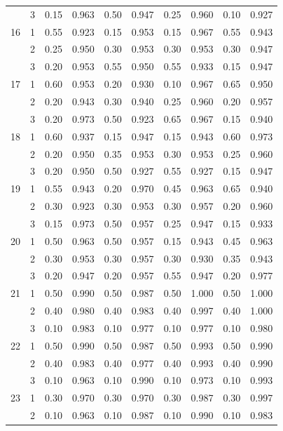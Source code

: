 \begin{longtable}{llcccccccc}
   & 3 & 0.15 & 0.963 & 0.50 & 0.947 & 0.25 & 0.960 & 0.10 & 0.927 \\ 
  16 & 1 & 0.55 & 0.923 & 0.15 & 0.953 & 0.15 & 0.967 & 0.55 & 0.943 \\ 
   & 2 & 0.25 & 0.950 & 0.30 & 0.953 & 0.30 & 0.953 & 0.30 & 0.947 \\ 
   & 3 & 0.20 & 0.953 & 0.55 & 0.950 & 0.55 & 0.933 & 0.15 & 0.947 \\ 
  17 & 1 & 0.60 & 0.953 & 0.20 & 0.930 & 0.10 & 0.967 & 0.65 & 0.950 \\ 
   & 2 & 0.20 & 0.943 & 0.30 & 0.940 & 0.25 & 0.960 & 0.20 & 0.957 \\ 
   & 3 & 0.20 & 0.973 & 0.50 & 0.923 & 0.65 & 0.967 & 0.15 & 0.940 \\ 
  18 & 1 & 0.60 & 0.937 & 0.15 & 0.947 & 0.15 & 0.943 & 0.60 & 0.973 \\ 
   & 2 & 0.20 & 0.950 & 0.35 & 0.953 & 0.30 & 0.953 & 0.25 & 0.960 \\ 
   & 3 & 0.20 & 0.950 & 0.50 & 0.927 & 0.55 & 0.927 & 0.15 & 0.947 \\ 
  19 & 1 & 0.55 & 0.943 & 0.20 & 0.970 & 0.45 & 0.963 & 0.65 & 0.940 \\ 
   & 2 & 0.30 & 0.923 & 0.30 & 0.953 & 0.30 & 0.957 & 0.20 & 0.960 \\ 
   & 3 & 0.15 & 0.973 & 0.50 & 0.957 & 0.25 & 0.947 & 0.15 & 0.933 \\ 
  20 & 1 & 0.50 & 0.963 & 0.50 & 0.957 & 0.15 & 0.943 & 0.45 & 0.963 \\ 
   & 2 & 0.30 & 0.953 & 0.30 & 0.957 & 0.30 & 0.930 & 0.35 & 0.943 \\ 
   & 3 & 0.20 & 0.947 & 0.20 & 0.957 & 0.55 & 0.947 & 0.20 & 0.977 \\ 
  21 & 1 & 0.50 & 0.990 & 0.50 & 0.987 & 0.50 & 1.000 & 0.50 & 1.000 \\ 
   & 2 & 0.40 & 0.980 & 0.40 & 0.983 & 0.40 & 0.997 & 0.40 & 1.000 \\ 
   & 3 & 0.10 & 0.983 & 0.10 & 0.977 & 0.10 & 0.977 & 0.10 & 0.980 \\ 
  22 & 1 & 0.50 & 0.990 & 0.50 & 0.987 & 0.50 & 0.993 & 0.50 & 0.990 \\ 
   & 2 & 0.40 & 0.983 & 0.40 & 0.977 & 0.40 & 0.993 & 0.40 & 0.990 \\ 
   & 3 & 0.10 & 0.963 & 0.10 & 0.990 & 0.10 & 0.973 & 0.10 & 0.993 \\ 
  23 & 1 & 0.30 & 0.970 & 0.30 & 0.970 & 0.30 & 0.987 & 0.30 & 0.997 \\ 
   & 2 & 0.10 & 0.963 & 0.10 & 0.987 & 0.10 & 0.990 & 0.10 & 0.983 \\ 

\end{longtable}
